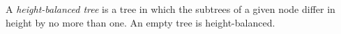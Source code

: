 \documentclass[12pt]{article}
\begin{document}
A \emph{height-balanced tree} is a tree in which the  subtrees of a given node
differ in height by no more than one. 
 An empty tree is height-balanced.
\end{document}
